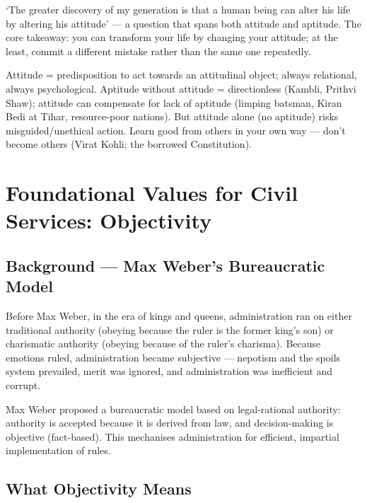 \begin{PYQLink}
`The greater discovery of my generation is that a human being can alter his life by altering his attitude' --- a question that spans both attitude and aptitude. The core takeaway: you can transform your life by changing your attitude; at the least, commit a different mistake rather than the same one repeatedly.
\end{PYQLink}

\begin{QuickRevision}
Attitude = predisposition to act towards an attitudinal object; always relational, always psychological. Aptitude without attitude = directionless (Kambli, Prithvi Shaw); attitude can compensate for lack of aptitude (limping batsman, Kiran Bedi at Tihar, resource-poor nations). But attitude alone (no aptitude) risks misguided/unethical action. Learn good from others in your own way --- don't become others (Virat Kohli; the borrowed Constitution).
\end{QuickRevision}

\section{Foundational Values for Civil Services: Objectivity}

\subsection{Background --- Max Weber's Bureaucratic Model}

Before Max Weber, in the era of kings and queens, administration ran on either traditional authority (obeying because the ruler is the former king's son) or charismatic authority (obeying because of the ruler's charisma). Because emotions ruled, administration became subjective --- nepotism and the spoils system prevailed, merit was ignored, and administration was inefficient and corrupt.

\begin{GovtPolicy}
Max Weber proposed a bureaucratic model based on legal-rational authority: authority is accepted because it is derived from law, and decision-making is objective (fact-based). This mechanises administration for efficient, impartial implementation of rules.
\end{GovtPolicy}

\subsection{What Objectivity Means}

